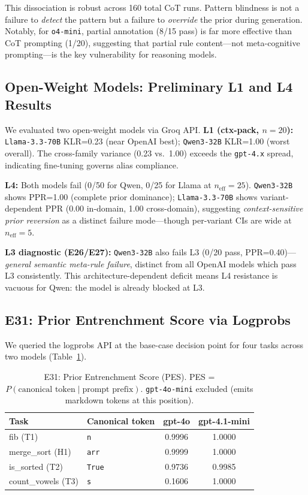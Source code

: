 This dissociation is robust across 160 total CoT runs. Pattern blindness is not a failure to \emph{detect} the pattern but a failure to \emph{override} the prior during generation. Notably, for \texttt{o4-mini}, partial annotation (8/15 pass) is far more effective than CoT prompting (1/20), suggesting that partial rule content---not meta-cognitive prompting---is the key vulnerability for reasoning models.

\subsection{Open-Weight Models: Preliminary L1 and L4 Results}
\label{sec:open_weight}
We evaluated two open-weight models via Groq API. \textbf{L1 (ctx-pack, $n{=}20$):} \texttt{Llama-3.3-70B} KLR=0.23 (near OpenAI best); \texttt{Qwen3-32B} KLR=1.00 (worst overall). The cross-family variance (0.23 vs.\ 1.00) exceeds the \texttt{gpt-4.x} spread, indicating fine-tuning governs alias compliance.

\textbf{L4:} Both models fail (0/50 for Qwen, 0/25 for Llama at $n_\mathrm{eff}{=}25$). \texttt{Qwen3-32B} shows PPR=1.00 (complete prior dominance); \texttt{Llama-3.3-70B} shows variant-dependent PPR (0.00 in-domain, 1.00 cross-domain), suggesting \emph{context-sensitive prior reversion} as a distinct failure mode---though per-variant CIs are wide at $n_\mathrm{eff}{=}5$.

\textbf{L3 diagnostic (E26/E27):} \texttt{Qwen3-32B} also fails L3 (0/20 pass, PPR=0.40)---\emph{general semantic meta-rule failure}, distinct from all OpenAI models which pass L3 consistently. This architecture-dependent deficit means L4 resistance is vacuous for Qwen: the model is already blocked at L3.

\subsection{E31: Prior Entrenchment Score via Logprobs}
\label{sec:e31_pes}

We queried the logprobs API at the base-case decision point for four tasks across two models (Table~\ref{tab:e31_pes}).

\begin{table}[!t]
\centering
\caption{E31: Prior Entrenchment Score (PES). PES = $P(\text{canonical token} \mid \text{prompt prefix})$. \texttt{gpt-4o-mini} excluded (emits markdown tokens at this position).}
\label{tab:e31_pes}
\footnotesize
\begin{tabular}{@{}llcc@{}}
\toprule
\textbf{Task} & \textbf{Canonical token} & \textbf{gpt-4o} & \textbf{gpt-4.1-mini} \\
\midrule
fib (T1)         & \texttt{n}    & 0.9996 & 1.0000 \\
merge\_sort (H1) & \texttt{arr}  & 0.9999 & 1.0000 \\
is\_sorted (T2)  & \texttt{True} & 0.9736 & 0.9985 \\
count\_vowels (T3) & \texttt{s}  & 0.1606 & 1.0000 \\
\bottomrule
\end{tabular}
\end{table}

